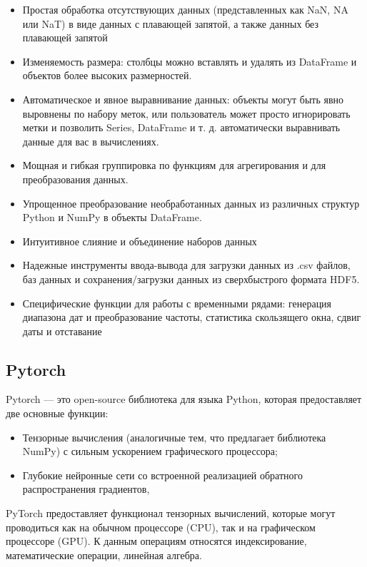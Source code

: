 \begin{itemize}
	\item Простая обработка отсутствующих данных (представленных как NaN, NA или NaT) в виде данных с плавающей запятой, а также данных без плавающей запятой
	\item Изменяемость размера: столбцы можно вставлять и удалять из DataFrame и объектов более высоких размерностей.
	\item Автоматическое и явное выравнивание данных: объекты могут быть явно выровнены по набору меток, или пользователь может просто игнорировать метки и позволить Series, DataFrame и т. д. автоматически выравнивать данные для вас в вычислениях.
	\item Мощная и гибкая группировка по функциям для агрегирования и для преобразования данных.
	\item Упрощенное преобразование необработанных данных из различных структур Python и NumPy в объекты DataFrame.
	\item Интуитивное слияние и объединение наборов данных
	\item Надежные инструменты ввода-вывода для загрузки данных из .csv файлов, баз данных и сохранения/загрузки данных из сверхбыстрого формата HDF5.
	\item Специфические функции для работы с временными рядами: генерация диапазона дат и преобразование частоты, статистика скользящего окна, сдвиг даты и отставание
\end{itemize}

\subsection{Pytorch}

Pytorch --- это open-source библиотека для языка Python, которая предоставляет две основные функции:
\begin{itemize}
	\item Тензорные вычисления (аналогичные тем, что предлагает библиотека NumPy) с сильным ускорением графического процессора;
	\item Глубокие нейронные сети со встроенной реализацией обратного распространения градиентов,
\end{itemize}

PyTorch предоставляет функционал тензорных вычислений, которые могут проводиться как на обычном процессоре (CPU), так и на графическом процессоре (GPU). К данным операциям относятся индексирование, математические операции, линейная алгебра.

